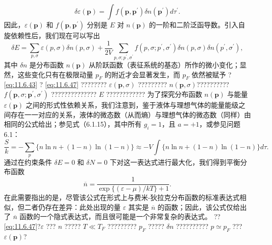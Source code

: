 \begin{equation}\tag{11.6.46}\label{eq:11.6.46}
\delta \varepsilon ( \pmb { p } ) = \int f ( \pmb { p } , \pmb { p } ^{\prime} ) \delta n ( \pmb { p } ^{\prime} ) d \tau ^{\prime} .
\end{equation}
因此，\(\varepsilon(\boldsymbol{p})\) 和 \(f(\boldsymbol{p},\boldsymbol{p}^{\prime})\) 分别是 \(E\) 对 \(n(\boldsymbol{p})\) 的一阶和二阶泛函导数。引入自旋依赖性后，我们现在可以写出
\begin{equation}\tag{11.6.47}\label{eq:11.6.47}
\delta E = \sum _ { p , \sigma } \varepsilon ( p , \sigma ) \delta n ( p , \sigma ) + \frac { 1 } { 2 V } \sum _ { p , \sigma ; p ^{\prime} , \sigma ^{\prime} } f ( p , \sigma ; p ^{\prime} , \sigma ^{\prime} ) \delta n ( p , \sigma ) \delta n ( p ^{\prime} , \sigma ^{\prime} ) ,
\end{equation}
其中 \(\delta n\) 是分布函数 \(n(\boldsymbol{p})\) 从阶跃函数（表征系统的基态）所作的微小变化；显然，这些变化只有在极限动量 \(p_F\) 的附近才会显著发生，而 \(p_F\) 依然被赋予
? \autoref{eq:11.6.43} ? \autoref{eq:11.6.47} ???????? \(\varepsilon(\boldsymbol{p},\sigma)\) ????????? \(n(\boldsymbol{p},\sigma)\)?????????? \(f(\boldsymbol{p},\sigma;\boldsymbol{p}^{\prime},\sigma^{\prime})\) ?????????????? \(E\) ????????????
为了探究分布函数 \(n(\boldsymbol{p})\) 与能量 \(\varepsilon(\boldsymbol{p})\) 之间的形式性依赖关系，我们注意到，鉴于液体与理想气体的能量能级之间存在一一对应的关系，液体的微态数（从而熵）与理想气体的微态数（同样）由相同的公式给出；参见式（6.1.15），其中所有 \(g_i=1\)，且 \(a=+1\)，或参见问题 6.1：
\begin{equation}\tag{11.6.48}\label{eq:11.6.48}
\frac { S } { k } = - \sum _ { p } \{ n \ln n + ( 1 - n ) \ln ( 1 - n ) \} \approx - V \int \{ n \ln n + ( 1 - n ) \ln ( 1 - n ) \} d \tau .
\end{equation}
通过在约束条件 \(\delta E=0\) 和 \(\delta N=0\) 下对这一表达式进行最大化，我们得到平衡分布函数
\begin{equation}\tag{11.6.49}\label{eq:11.6.49}
\overline { { n } } = \frac { 1 } { \exp \{ ( \varepsilon - \mu ) / k T \} + 1 } .
\end{equation}
在此需要指出的是，尽管该公式在形式上与费米-狄拉克分布函数的标准表达式相似，但二者仍存在差异：此处出现的量 \(\varepsilon\) 其实是 \(\overline{n}\) 的函数；因此，该公式仅给出了 \(\overline{n}\) 函数的一个隐式表达式，而且很可能是一个非常复杂的表达式。
?? \autoref{eq:11.6.47}?\(\varepsilon\) ??? \(n\) ????? \(T \ll T_F\) ????????? \(p_F\) ????? \(\delta n\) ?????????? \(p\simeq p_F\) ??? \(\varepsilon(\mathbf{p})\)?
